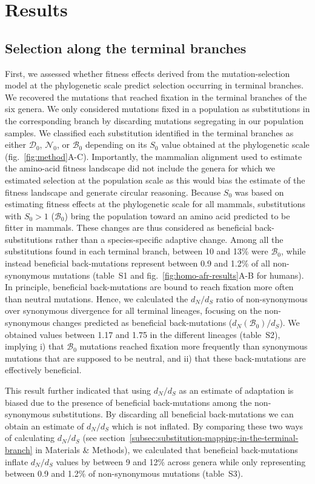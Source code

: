 \documentclass[9pt,twocolumn,twoside,lineno]{pnas-new}
\newcommand{\dn}{d_N}
\newcommand{\ds}{d_S}
\newcommand{\dnds}{\dn / \ds}
\newcommand{\Sphy}{S_{0}}
\newcommand{\SphyDel}{\mathcal{D}_0}
\newcommand{\SphyNeu}{\mathcal{N}_0}
\newcommand{\SphyBen}{\mathcal{B}_0}
\begin{document}
\section*{Results}\label{sec:results}

\subsection*{Selection along the terminal branches}
First, we assessed whether fitness effects derived from the mutation-selection model at the phylogenetic scale predict selection occurring in terminal branches.
We recovered the mutations that reached fixation in the terminal branches of the six genera.
We only considered mutations fixed in a population as substitutions in the corresponding branch by discarding mutations segregating in our population samples.
We classified each substitution identified in the terminal branches as either $\SphyDel$, $\SphyNeu$, or $\SphyBen$ depending on its $\Sphy$ value obtained at the phylogenetic scale (fig.~\ref{fig:method}A-C).
Importantly, the mammalian alignment used to estimate the amino-acid fitness landscape did not include the genera for which we estimated selection at the population scale as this would bias the estimate of the fitness landscape and generate circular reasoning.
Because $\Sphy$ was based on estimating fitness effects at the phylogenetic scale for all mammals, substitutions with $\Sphy>1$ ($\SphyBen$) bring the population toward an amino acid predicted to be fitter in mammals.
These changes are thus considered as beneficial back-substitutions rather than a species-specific adaptive change.
Among all the substitutions found in each terminal branch, between 10 and 13\% were $\SphyBen$, while instead beneficial back-mutations represent between 0.9 and 1.2\% of all non-synonymous mutations (table~S1 and fig.~\ref{fig:homo-afr-results}A-B for humans).
In principle, beneficial back-mutations are bound to reach fixation more often than neutral mutations.
Hence, we calculated the $\dnds$ ratio of non-synonymous over synonymous divergence for all terminal lineages, focusing on the non-synonymous changes predicted as beneficial back-mutations ($\dn(\SphyBen) / \ds$).
We obtained values between 1.17 and 1.75 in the different lineages (table~S2), implying i) that $\SphyBen$ mutations reached fixation more frequently than synonymous mutations that are supposed to be neutral, and ii) that these back-mutations are effectively beneficial.

This result further indicated that using $\dnds$ as an estimate of adaptation is biased due to the presence of beneficial back-mutations among the non-synonymous substitutions.
By discarding all beneficial back-mutations we can obtain an estimate of $\dnds$ which is not inflated.
By comparing these two ways of calculating $\dnds$ (see section~\ref{subsec:substitution-mapping-in-the-terminal-branch} in Materials \& Methods), we calculated that beneficial back-mutations inflate $\dnds$ values by between 9 and 12\% across genera while only representing between 0.9 and 1.2\% of non-synonymous mutations (table~S3).
\end{document}
